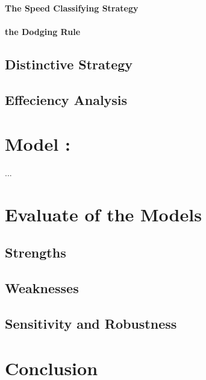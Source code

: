 \paragraph{The Speed Classifying Strategy}
\paragraph{the Dodging Rule}
\subsection{Distinctive Strategy}

\subsection{Effeciency Analysis}

\section{Model \uppercase\expandafter{}: }
... 

\section{Evaluate of the Models}
\subsection{Strengths}

\subsection{Weaknesses}

\subsection{Sensitivity and Robustness}
\section{Conclusion}



